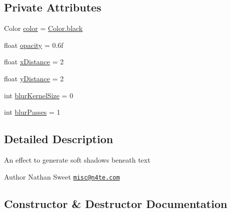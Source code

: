 \subsection*{Private Attributes}
\begin{DoxyCompactItemize}
\item 
Color \mbox{\hyperlink{classorg_1_1newdawn_1_1slick_1_1font_1_1effects_1_1_shadow_effect_a4a5a1c31b38b33b042cadabe1593bc62}{color}} = \mbox{\hyperlink{classorg_1_1newdawn_1_1slick_1_1_color_ac9ec721980ab1c388e82e2f8e584f002}{Color.\+black}}
\item 
float \mbox{\hyperlink{classorg_1_1newdawn_1_1slick_1_1font_1_1effects_1_1_shadow_effect_a6a03f4db2ffd55023ab5f9fde923dc0e}{opacity}} = 0.\+6f
\item 
float \mbox{\hyperlink{classorg_1_1newdawn_1_1slick_1_1font_1_1effects_1_1_shadow_effect_a4d3581fba8877de112c8a1ec28cdf03d}{x\+Distance}} = 2
\item 
float \mbox{\hyperlink{classorg_1_1newdawn_1_1slick_1_1font_1_1effects_1_1_shadow_effect_a06d791511d507ab313c764edbde43fa8}{y\+Distance}} = 2
\item 
int \mbox{\hyperlink{classorg_1_1newdawn_1_1slick_1_1font_1_1effects_1_1_shadow_effect_a9383b2ba78f68f6302bfd9e9cb5de0f0}{blur\+Kernel\+Size}} = 0
\item 
int \mbox{\hyperlink{classorg_1_1newdawn_1_1slick_1_1font_1_1effects_1_1_shadow_effect_ae7079addc56e471f5c8747ffc8397a92}{blur\+Passes}} = 1
\end{DoxyCompactItemize}


\subsection{Detailed Description}
An effect to generate soft shadows beneath text

\begin{DoxyAuthor}{Author}
Nathan Sweet \href{mailto:misc@n4te.com}{\tt misc@n4te.\+com} 
\end{DoxyAuthor}


\subsection{Constructor \& Destructor Documentation}
\mbox{\label{classorg_1_1newdawn_1_1slick_1_1font_1_1effects_1_1_shadow_effect_a43a9216175f4935883c4b403633123b3}} 
